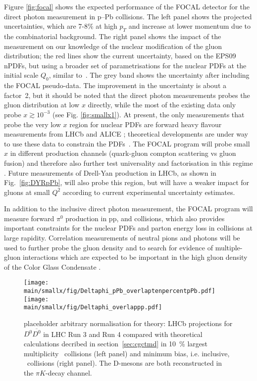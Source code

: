 \documentclass[../report.tex]{subfiles}
\providecommand{\main}{..}
\begin{document}
Figure \ref{fig:focal} shows the expected performance of the FOCAL detector for the direct photon measurement in p--Pb collisions. The left panel shows the projected uncertainties, which are 7-8\% at high $p_{T}$ and increase at lower momentum due to the combinatorial background. The right panel shows the impact of the measurement on our knowledge of the nuclear modification of the gluon distribution; the red lines show the current uncertainty, based on the EPS09 nPDFs, but using a broader set of parametrisations for the nuclear PDFs at the initial scale $Q_0$, similar to~\cite{Aschenauer:2017oxs}. The grey band shows the uncertainty after including the FOCAL pseudo-data. The improvement in the uncertainty is about a factor~2, but it should be noted that the direct photon measurements probes the gluon distribution at low $x$ directly, while the most of the existing data only probe $x \gtrsim 10^{-3}$ (see Fig. \ref{fig:smallx1}). At present, the only measurements that probe the very low $x$ region for nuclear PDFs are forward heavy flavour measurements from LHCb \cite{Aaij:2017gcy,Aaij:2017cqq} and ALICE \cite{Acharya:2017hdv}; theoretical developments are under way to use these data to constrain the PDFs~\cite{Kusina:2017gkz,Helenius:2018uul}. The FOCAL program will probe small $x$ in different production channels (quark-gluon compton scattering vs gluon fusion) and therefore also further test universality and factorisation in this regime \cite{Helenius:2014qla}. Future measurements of Drell-Yan production in LHCb, as shown in Fig.~\ref{fig:DYRpPb}, will also probe this region, but will have a weaker impact for gluons at small $Q^2$ according to current experimental uncertainty estimates. 

In addition to the inclusive direct photon measurement, the FOCAL program will measure forward $\pi^{0}$ production in pp, \pPb and \PbPb collisions, which also provides important constraints for the nuclear PDFs and parton energy loss in \PbPb collisions at large rapidity. Correlation measurements of neutral pions and photons will be used to further probe the gluon density and to search for evidence of multiple-gluon interactions which are expected to be important in the high gluon density of the Color Glass Condensate \cite{Kharzeev:2004bw,vanHameren:2014lna}.



\clearpage
\newpage


\begin{figure}
\texttt{[image: \\main/smallx/fig/Deltaphi\_pPb\_overlaptenpercentpPb.pdf]}
\texttt{[image: \\main/smallx/fig/Deltaphi\_overlappp.pdf]}
\caption{ placeholder arbitrary normalisation for theory: LHCb projections for $D^0 \overline{D^0}$ in LHC Run 3 and Run 4 compared with theoretical calculations decribed in section~\ref{sec:cgctmd} in 10~\% largest multiplicity \pPb~collisions (left panel) and minimum bias, i.e. inclusive, \pp~collisions (right panel). The D-mesons are  both reconstructed in the $\pi K$-decay channel.}
\label{fig:ccbarlhcb}
\end{figure}
\end{document}
